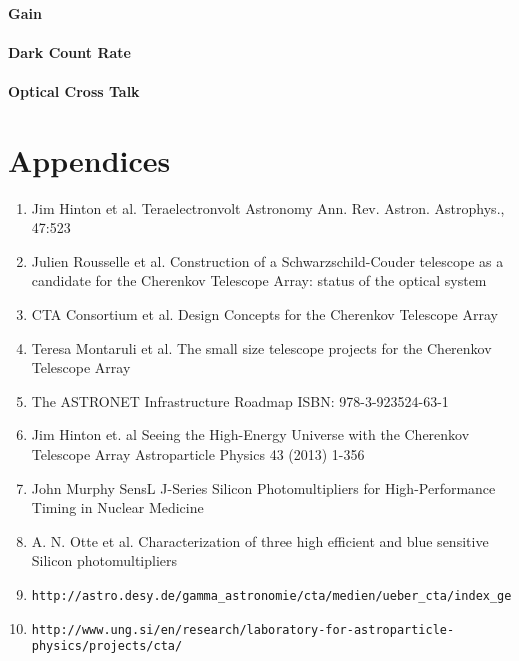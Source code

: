\documentclass[article,type=msc,colorback,accentcolor=tud9c]{tudthesis}
\begin{document}
        \subsubsection{Gain}
        \subsubsection{Dark Count Rate}
        \subsubsection{Optical Cross Talk}





\newpage
\chapter{Appendices}
\begin{enumerate}
\item Jim Hinton et al. Teraelectronvolt Astronomy Ann. Rev. Astron. Astrophys., 47:523
\item Julien Rousselle et al. Construction of a Schwarzschild-Couder telescope as a candidate for the Cherenkov Telescope Array: status of the optical system
\item CTA Consortium et al. Design Concepts for the Cherenkov Telescope Array
\item Teresa Montaruli et al. The small size telescope projects for the Cherenkov Telescope Array
\item The ASTRONET Infrastructure Roadmap ISBN: 978-3-923524-63-1
\item Jim Hinton et. al Seeing the High-Energy Universe with the Cherenkov Telescope Array Astroparticle Physics 43 (2013) 1-356 
\item John Murphy SensL J-Series Silicon Photomultipliers for High-Performance Timing in Nuclear Medicine 
\item A. N. Otte et al. Characterization of three high efficient and blue sensitive Silicon photomultipliers
\item \begin{verbatim}http://astro.desy.de/gamma_astronomie/cta/medien/ueber_cta/index_ger.html\end{verbatim}
\item \begin{verbatim}http://www.ung.si/en/research/laboratory-for-astroparticle-physics/projects/cta/\end{verbatim}
\end{enumerate}
\end{document}
